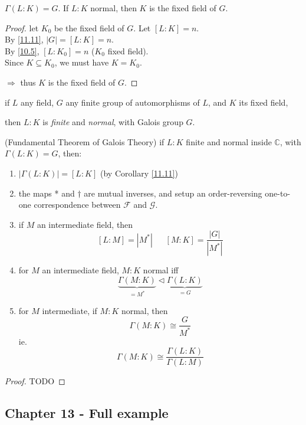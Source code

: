 \documentclass{article}
\theoremstyle{definition}
\newenvironment{thm}[1]
{\renewcommand\theinnerthm{#1}\innerthm}
{\endinnerthm}
\begin{document}
\begin{thm}{11.12}
  $\Gamma(L:K) = G$. If $L:K$ normal, then $K$ is the fixed field of $G$.
\end{thm}
\begin{proof}
  let $K_0$ be the fixed field of $G$. Let $[L:K]=n$.\\
  By \ref{11.11}, $|G| = [L:K] = n$.\\
  By \ref{10.5}, $[L:K_0]=n$ ($K_0$ fixed field).\\
  Since $K \subseteq K_0$, we must have $K=K_0$.

  $\Longrightarrow$ thus $K$ is the fixed field of $G$.
\end{proof}

\begin{thm}{11.14}
  if $L$ any field, $G$ any finite group of automorphisms of $L$, and $K$ its fixed field,

  then $L:K$ is \emph{finite} and \emph{normal}, with Galois group $G$.
\end{thm}


\begin{thm}{12.2}(Fundamental Theorem of Galois Theory)
  if $L:K$ finite and normal inside $\mathbb{C}$, with $\Gamma(L:K)=G$, then:
  \begin{enumerate}
    \item $|\Gamma(L:K)| = [L:K]$
      (by Corollary \ref{11.11})
    \item the maps * and $\dagger$ are mutual inverses, and setup an order-reversing one-to-one correspondence between $\mathcal{F}$ and $\mathcal{G}$.
    \item if $M$ an intermediate field, then
      $$[L:M] = |M^*|~~~~~~~ [M:K]=\frac{|G|}{|M^*|}$$
    \item for $M$ an intermediate field, $M:K$ normal iff
      $$\underbrace{\Gamma(M:K)}_{=M^*} \lhd \underbrace{\Gamma(L:K)}_{=G}$$
    \item for $M$ intermediate, if $M:K$ normal, then
      $$\Gamma(M:K) \cong \frac{G}{M^*}$$
      ie.
      $$\Gamma(M:K) \cong \frac{\Gamma(L:K)}{\Gamma(L:M)}$$
  \end{enumerate}
\end{thm}
\begin{proof}
  TODO
\end{proof}

\subsection{Chapter 13 - Full example}
\end{document}
